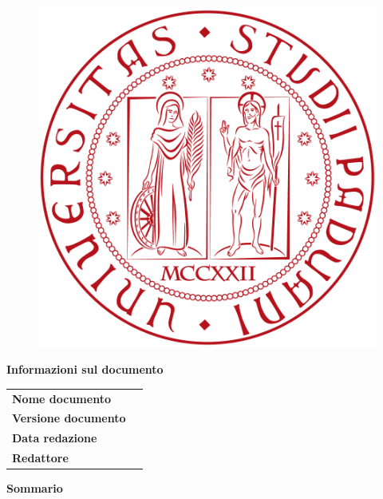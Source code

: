 % 
%
%
%

\begin{center}
	
	\begin{figure}[!t]
		\centering
		\includegraphics[scale=0.3]{../template/img/unipd_logo.png}
	\end{figure}
	
	\textbf{\Large Informazioni sul documento}
	\vspace{0.5 cm}

	\begin{longtable}{ l | p{6 cm} } %
		\textbf{Nome documento} &  {\documentName} \\[0.5 cm]
		\textbf{Versione documento} & {\documentVersion} \\[0.5 cm]
		\textbf{Data redazione} & {\redactionDate} \\[0.5 cm]
		\textbf{Redattore} & \parbox{\textwidth}{\documentListAuthor} \\[0.5 cm]
	\end{longtable}

	\vspace{2 cm}

	\textbf{\Large Sommario} \\
	\documentScope

\end{center}

\pagebreak